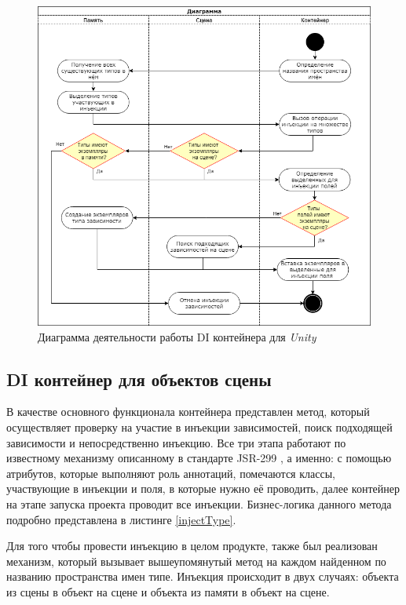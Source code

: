 \begin{figure}[h]
	\centering
	\includegraphics[width=\linewidth]{containerDI.png}
	\caption{Диаграмма деятельности работы DI контейнера для \textit{Unity}}
	\label{injectionIllustration}
\end{figure}

\subsection{DI контейнер для объектов сцены}
В качестве основного функционала контейнера представлен метод, который осуществляет проверку на участие в инъекции зависимостей, поиск подходящей зависимости и непосредственно инъекцию. Все три этапа работают по известному механизму описанному в стандарте JSR-299 \cite{jsr}, а именно: с помощью атрибутов, которые выполняют роль аннотаций, помечаются классы, участвующие в инъекции и поля, в которые нужно её проводить, далее контейнер на этапе запуска проекта проводит все инъекции. Бизнес-логика данного метода подробно представлена в листинге \ref{injectType}.

Для того чтобы провести инъекцию в целом продукте, также был реализован механизм, который вызывает вышеупомянутый метод на каждом найденном по названию пространства имен типе. Инъекция происходит в двух случаях: объекта из сцены в объект на сцене и объекта из памяти в объект на сцене. 

